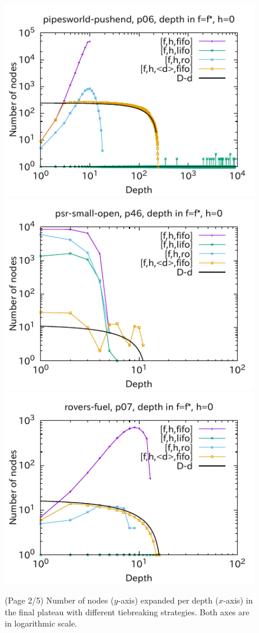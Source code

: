 \begin{figure}[htbp]
\includegraphics{img/output-lmcut/pipesworld-pushend/p06-0.pdf}
\includegraphics{img/output-lmcut/psr-small-open/p46-0.pdf}
\includegraphics{img/output-lmcut/rovers-fuel/p07-0.pdf}
 \caption{(Page 2/5) Number of nodes ($y$-axis) expanded per depth ($x$-axis) in
 the final plateau with different tiebreaking strategies. Both axes are in logarithmic scale.
 }
 \label{fig:depth-histogram2}
\end{figure}


